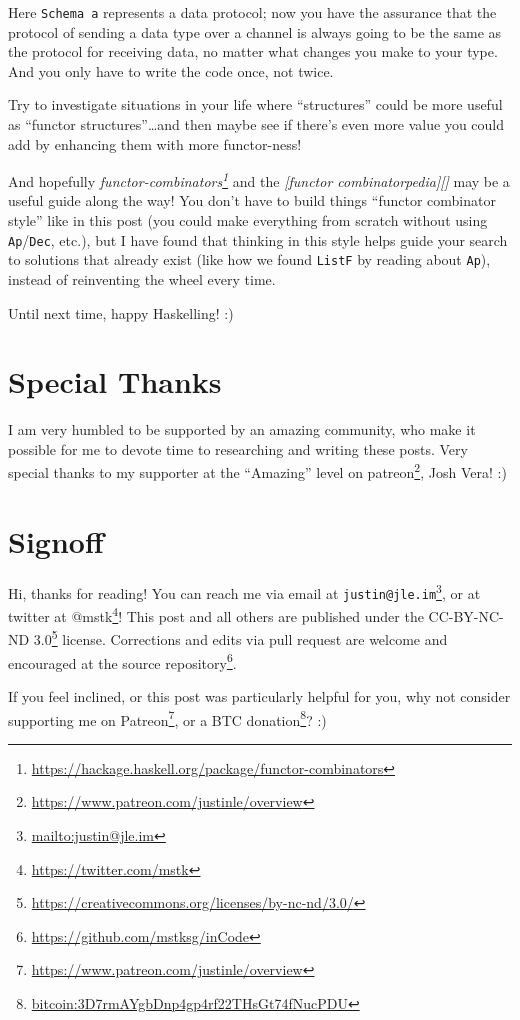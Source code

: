 \documentclass[]{article}
\renewcommand{\href}[2]{#2\footnote{\url{#1}}}
\begin{document}
Here \texttt{Schema\ a} represents a data protocol; now you have the assurance
that the protocol of sending a data type over a channel is always going to be
the same as the protocol for receiving data, no matter what changes you make to
your type. And you only have to write the code once, not twice.

Try to investigate situations in your life where ``structures'' could be more
useful as ``functor structures''\ldots and then maybe see if there's even more
value you could add by enhancing them with more functor-ness!

And hopefully
\emph{\href{https://hackage.haskell.org/package/functor-combinators}{functor-combinators}}
and the \emph{{[}functor combinatorpedia{]}{[}{]}} may be a useful guide along
the way! You don't have to build things ``functor combinator style'' like in
this post (you could make everything from scratch without using
\texttt{Ap}/\texttt{Dec}, etc.), but I have found that thinking in this style
helps guide your search to solutions that already exist (like how we found
\texttt{ListF} by reading about \texttt{Ap}), instead of reinventing the wheel
every time.

Until next time, happy Haskelling! :)

\hypertarget{special-thanks}{%
\section{Special Thanks}\label{special-thanks}}

I am very humbled to be supported by an amazing community, who make it possible
for me to devote time to researching and writing these posts. Very special
thanks to my supporter at the ``Amazing'' level on
\href{https://www.patreon.com/justinle/overview}{patreon}, Josh Vera! :)

\hypertarget{signoff}{%
\section{Signoff}\label{signoff}}

Hi, thanks for reading! You can reach me via email at
\href{mailto:justin@jle.im}{\nolinkurl{justin@jle.im}}, or at twitter at
\href{https://twitter.com/mstk}{@mstk}! This post and all others are published
under the \href{https://creativecommons.org/licenses/by-nc-nd/3.0/}{CC-BY-NC-ND
3.0} license. Corrections and edits via pull request are welcome and encouraged
at \href{https://github.com/mstksg/inCode}{the source repository}.

If you feel inclined, or this post was particularly helpful for you, why not
consider \href{https://www.patreon.com/justinle/overview}{supporting me on
Patreon}, or a \href{bitcoin:3D7rmAYgbDnp4gp4rf22THsGt74fNucPDU}{BTC donation}?
:)
\end{document}

